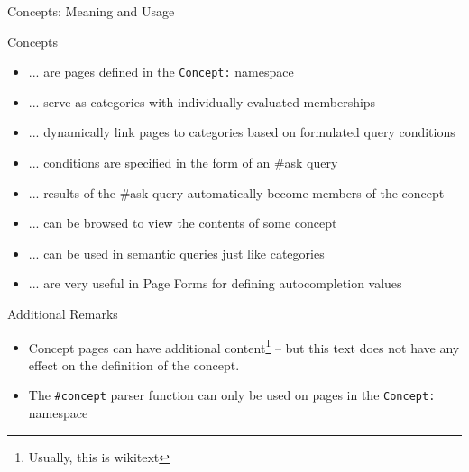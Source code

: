 \documentclass[aspectratio=1610,onlymath]{beamer}
\begin{document}
\begin{frame}[fragile]{Concepts: Meaning and Usage}

\alert{Concepts}
\begin{itemize}
	\item[] ... are pages defined in the \texttt{Concept:} namespace
	\item[] ... serve as categories with individually evaluated memberships
	\item[] ... dynamically link pages to categories based on formulated query conditions
	\item[] ... conditions are specified in the form of an \alert{\#ask query}
	\item[] ... results of the \#ask query automatically become members of the concept
	\item[] ... can be browsed to view the contents of some concept
	\item[] ... can be used in semantic queries just like categories
	\item[] ... are very useful in \alert{Page Forms} for defining autocompletion values 
\end{itemize}

\bigskip
\alert{Additional Remarks}
\begin{itemize}
	\item[] Concept pages can have additional content\footnote{Usually, this is wikitext} – but this text does not have any effect on the definition of the concept.
	\item[] The \alert{\texttt{\#concept} parser function} can only be used on pages in the \texttt{Concept:} namespace
\end{itemize}






\end{frame}
\end{document}
